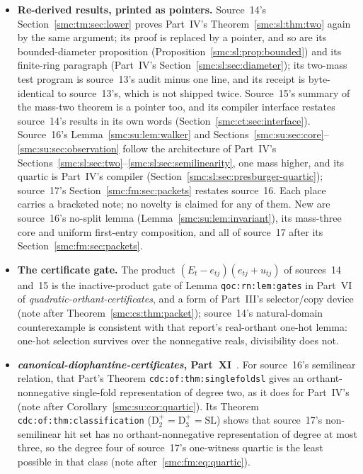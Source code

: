 \documentclass[11pt,letterpaper]{article}
\numberwithin{equation}{section}
\theoremstyle{definition}
\theoremstyle{remark}
\begin{document}
\begin{itemize}
\item \textbf{Re-derived results, printed as pointers.} Source~14's Section~\ref{smc:tm:sec:lower} proves Part~IV's Theorem~\ref{smc:sl:thm:two} again by the same argument; its proof is replaced by a pointer, and so are its bounded-diameter proposition (Proposition~\ref{smc:sl:prop:bounded}) and its finite-ring paragraph (Part~IV's Section~\ref{smc:sl:sec:diameter}); its two-mass test program is source~13's audit minus one line, and its receipt is byte-identical to source~13's, which is not shipped twice. Source~15's summary of the mass-two theorem is a pointer too, and its compiler interface restates source~14's results in its own words (Section~\ref{smc:ct:sec:interface}). Source~16's Lemma~\ref{smc:su:lem:walker} and Sections~\ref{smc:su:sec:core}--\ref{smc:su:sec:observation} follow the architecture of Part~IV's Sections~\ref{smc:sl:sec:two}--\ref{smc:sl:sec:semilinearity}, one mass higher, and its quartic is Part~IV's compiler (Section~\ref{smc:sl:sec:presburger-quartic}); source~17's Section~\ref{smc:fm:sec:packets} restates source~16. Each place carries a bracketed note; no novelty is claimed for any of them. New are source~16's no-split lemma (Lemma~\ref{smc:su:lem:invariant}), its mass-three core and uniform first-entry composition, and all of source~17 after its Section~\ref{smc:fm:sec:packets}.
\item \textbf{The certificate gate.} The product $(E_t-e_{tj})(e_{tj}+u_{tj})$ of sources~14 and~15 is the inactive-product gate of Lemma \texttt{qoc:rn:lem:gates} in Part~VI of \emph{quadratic-orthant-certificates}, and a form of Part~III's selector/copy device (note after Theorem~\ref{smc:cs:thm:packet}); source~14's natural-domain counterexample is consistent with that report's real-orthant one-hot lemma: one-hot selection survives over the nonnegative reals, divisibility does not.
\item \textbf{\emph{canonical-diophantine-certificates}, Part~XI}~\cite{cdc}. For source~16's semilinear relation, that Part's Theorem \texttt{cdc:of:thm:singlefoldsl} gives an orthant-nonnegative single-fold representation of degree two, as it does for Part~IV's (note after Corollary~\ref{smc:su:cor:quartic}). Its Theorem \texttt{cdc:of:thm:classification} ($\mathrm D^+_2=\mathrm D^+_3=\mathrm{SL}$) shows that source~17's non-semilinear hit set has no orthant-nonnegative representation of degree at most three, so the degree four of source~17's one-witness quartic is the least possible in that class (note after~\eqref{smc:fm:eq:quartic}).

\end{itemize}
\end{document}
